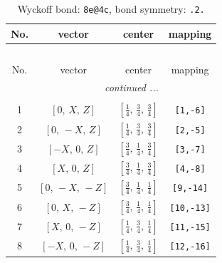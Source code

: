 \documentclass[fleqn,8pt]{jsarticle}
\begin{document}
\begin{longtable}{cccc}
\caption{Wyckoff bond: {\tt 8e@4c}, bond symmetry: {\tt .2.}}
 \\
 \hline \hline
No. & vector & center & mapping \\ \hline \endfirsthead

\multicolumn{3}{l}{\tablename\ \thetable{}} \\
 \hline \hline
No. & vector & center & mapping \\ \hline \endhead

 \hline \hline
\multicolumn{3}{r}{\footnotesize\it continued ...} \\ \endfoot

 \hline \hline
\multicolumn{3}{r}{} \\ \endlastfoot

1 & $\left[ 0,\, X,\, Z \right]$ & $\left[ \frac{1}{4},\, \frac{3}{4},\, \frac{3}{4} \right]$ & {\tt [1,-6]} \\ \hline
2 & $\left[ 0,\, - X,\, Z \right]$ & $\left[ \frac{1}{4},\, \frac{3}{4},\, \frac{3}{4} \right]$ & {\tt [2,-5]} \\ \hline
3 & $\left[ - X,\, 0,\, Z \right]$ & $\left[ \frac{3}{4},\, \frac{1}{4},\, \frac{3}{4} \right]$ & {\tt [3,-7]} \\ \hline
4 & $\left[ X,\, 0,\, Z \right]$ & $\left[ \frac{3}{4},\, \frac{1}{4},\, \frac{3}{4} \right]$ & {\tt [4,-8]} \\ \hline
5 & $\left[ 0,\, - X,\, - Z \right]$ & $\left[ \frac{3}{4},\, \frac{1}{4},\, \frac{1}{4} \right]$ & {\tt [9,-14]} \\ \hline
6 & $\left[ 0,\, X,\, - Z \right]$ & $\left[ \frac{3}{4},\, \frac{1}{4},\, \frac{1}{4} \right]$ & {\tt [10,-13]} \\ \hline
7 & $\left[ X,\, 0,\, - Z \right]$ & $\left[ \frac{1}{4},\, \frac{3}{4},\, \frac{1}{4} \right]$ & {\tt [11,-15]} \\ \hline
8 & $\left[ - X,\, 0,\, - Z \right]$ & $\left[ \frac{1}{4},\, \frac{3}{4},\, \frac{1}{4} \right]$ & {\tt [12,-16]} \\
\end{longtable}
\renewcommand{\arraystretch}{1.2}
\end{document}
